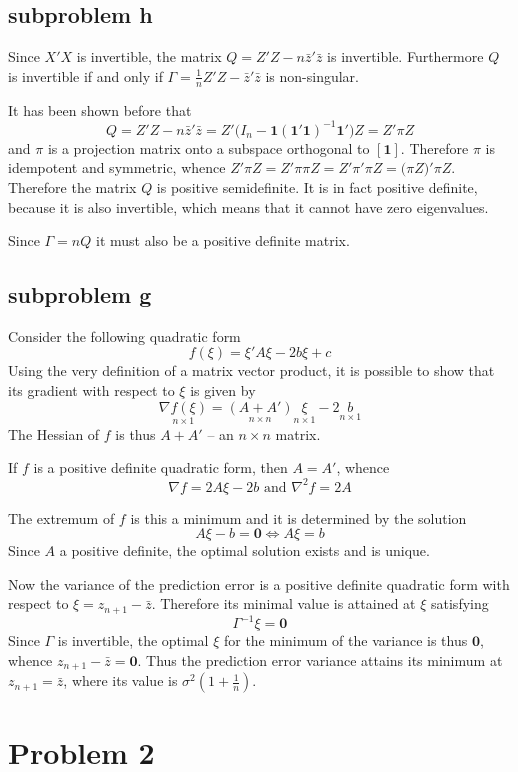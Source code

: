 \documentclass[a4paper]{article}
\newcommand{\clo}[1]{{\left [ #1 \right ]}}
\newcommand{\e}{\mathbf{1}}
\begin{document}

\subsection{subproblem h} %
\label{sub:subproblem_h}

Since $X'X$ is invertible, the matrix $Q = Z'Z - n \bar{z}'\bar{z}$ is
invertible. Furthermore $Q$ is invertible if and only if
$\Gamma = \frac{1}{n} Z'Z - \bar{z}'\bar{z}$ is non-singular.

It has been shown before that
\[Q = Z'Z - n \bar{z}'\bar{z} = Z'\big(I_n - \e(\e'\e)^{-1}\e'\big) Z = Z'\pi Z\]
and $\pi$ is a projection matrix onto a subspace orthogonal to $\clo{\e}$.
Therefore $\pi$ is idempotent and symmetric, whence $Z'\pi Z = Z'\pi \pi Z =
Z'\pi' \pi Z = \big(\pi Z\big)'\pi Z$. Therefore the matrix $Q$ is positive
semidefinite. It is in fact positive definite, because it is also invertible,
which means that it cannot have zero eigenvalues.

Since $\Gamma = n Q$ it must also be a positive definite matrix.


\subsection{subproblem g} %
\label{sub:subproblem_g}

Consider the following quadratic form
\[ f(\xi) =  \xi'A\xi - 2 b \xi + c\]
Using the very definition of a matrix vector product, it is possible to show
that its gradient with respect to $\xi$ is given by
\[\underset{n\times 1}{\nabla f(\xi)} = \underset{n\times n}{(A+A')} \underset{n\times 1}{\xi} - 2 \underset{n\times 1}{b}\]
The Hessian of $f$ is thus $A+A'$ -- an $n\times n$ matrix.

If $f$ is a positive definite quadratic form, then $A=A'$, whence 
\[\nabla f = 2 A\xi - 2 b \text{ and } \nabla^2 f = 2A\]

The extremum of $f$ is this a minimum and it is determined by the solution
\[ A\xi - b = \mathbf{0} \Leftrightarrow A\xi = b\]
Since $A$ a positive definite, the optimal solution exists and is unique.

Now the variance of the prediction error is a positive definite quadratic form
with respect to $\xi = z_{n+1} - \bar{z}$. Therefore its minimal value is
attained at $\xi$ satisfying
\[\Gamma^{-1} \xi = \mathbf{0}\]
Since $\Gamma$ is invertible, the optimal $\xi$ for the minimum of the
variance is thus $\mathbf{0}$, whence $z_{n+1} - \bar{z} = \mathbf{0}$. Thus
the prediction error variance attains its minimum at $z_{n+1} = \bar{z}$,
where its value is $\sigma^2(1+\frac{1}{n})$.



\clearpage

\section{Problem 2} %
\label{sec:problem_2}


\end{document}
